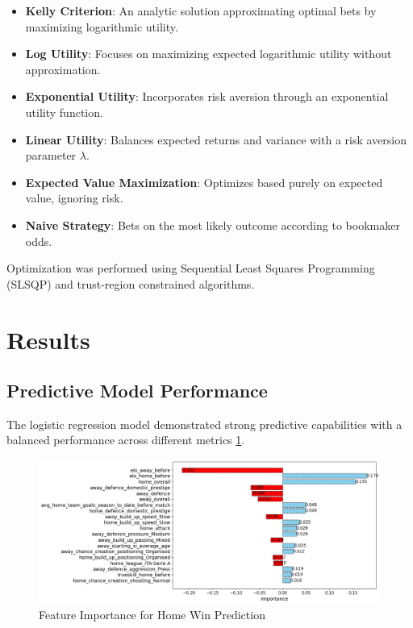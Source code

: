 \documentclass[6pt,twocolumn]{article}
\begin{document}
\begin{itemize}
    \setlength\itemsep{2pt} %
    \setlength\parskip{0pt} %
    \setlength\topsep{0pt}  %
    \setlength\partopsep{0pt} %
    \item \textbf{Kelly Criterion}: An analytic solution approximating optimal bets by maximizing logarithmic utility.
    \item \textbf{Log Utility}: Focuses on maximizing expected logarithmic utility without approximation.
    \item \textbf{Exponential Utility}: Incorporates risk aversion through an exponential utility function.
    \item \textbf{Linear Utility}: Balances expected returns and variance with a risk aversion parameter $\lambda$.
    \item \textbf{Expected Value Maximization}: Optimizes based purely on expected value, ignoring risk.
    \item \textbf{Naive Strategy}: Bets on the most likely outcome according to bookmaker odds.
\end{itemize}

Optimization was performed using Sequential Least Squares Programming (SLSQP) and trust-region constrained algorithms.

\section{Results}
\subsection{Predictive Model Performance}
The logistic regression model demonstrated strong predictive capabilities with a balanced performance across different metrics \ref{fig:feature_importance}.

\begin{figure}[h]
    \centering
    \includegraphics[width=1.12\linewidth]{statics/top20_coeff_importance_lr_selected_features_away.png}
    \caption{Feature Importance for Home Win Prediction}
    \label{fig:feature_importance}
\end{figure}
\end{document}
